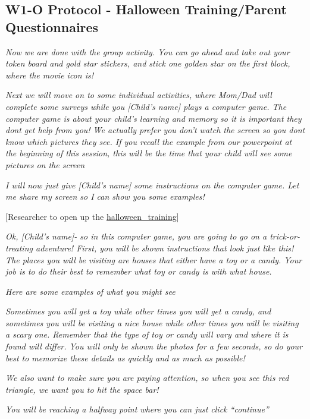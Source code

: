 \documentclass[]{book}
\begin{document}
\hypertarget{w1-o-protocol---halloween-trainingparent-questionnaires}{%
\subsection{W1-O Protocol - Halloween Training/Parent Questionnaires}\label{w1-o-protocol---halloween-trainingparent-questionnaires}}

\emph{Now we are done with the group activity. You can go ahead and take out your token board and gold star stickers, and stick one golden star on the first block, where the movie icon is!}

\emph{Next we will move on to some individual activities, where Mom/Dad will complete some surveys while you {[}Child's name{]} plays a computer game. The computer game is about your child's learning and memory so it is important they dont get help from you! We actually prefer you don't watch the screen so you dont know which pictures they see. If you recall the example from our powerpoint at the beginning of this session, this will be the time that your child will see some pictures on the screen}

\emph{I will now just give {[}Child's name{]} some instructions on the computer game. Let me share my screen so I can show you some examples!}

{[}Researcher to open up the \href{https://ucla.app.box.com/file/709481066655}{halloween\_training}{]}

\emph{Ok, {[}Child's name{]}- so in this computer game, you are going to go on a trick-or-treating adventure! First, you will be shown instructions that look just like this! The places you will be visiting are houses that either have a toy or a candy. Your job is to do their best to remember what toy or candy is with what house.}

\emph{Here are some examples of what you might see}

\emph{Sometimes you will get a toy while other times you will get a candy, and sometimes you will be visiting a nice house while other times you will be visiting a scary one. Remember that the type of toy or candy will vary and where it is found will differ. You will only be shown the photos for a few seconds, so do your best to memorize these details as quickly and as much as possible!}

\emph{We also want to make sure you are paying attention, so when you see this red triangle, we want you to hit the space bar!}

\emph{You will be reaching a halfway point where you can just click ``continue''}
\end{document}
